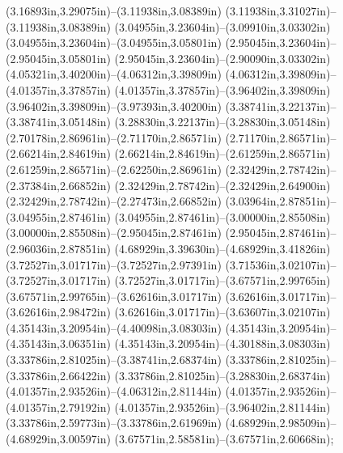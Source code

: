 (3.16893in,3.29075in)--(3.11938in,3.08389in) (3.11938in,3.31027in)--(3.11938in,3.08389in) (3.04955in,3.23604in)--(3.09910in,3.03302in) (3.04955in,3.23604in)--(3.04955in,3.05801in) (2.95045in,3.23604in)--(2.95045in,3.05801in) (2.95045in,3.23604in)--(2.90090in,3.03302in) (4.05321in,3.40200in)--(4.06312in,3.39809in) (4.06312in,3.39809in)--(4.01357in,3.37857in) (4.01357in,3.37857in)--(3.96402in,3.39809in) (3.96402in,3.39809in)--(3.97393in,3.40200in) (3.38741in,3.22137in)--(3.38741in,3.05148in) (3.28830in,3.22137in)--(3.28830in,3.05148in) (2.70178in,2.86961in)--(2.71170in,2.86571in) (2.71170in,2.86571in)--(2.66214in,2.84619in) (2.66214in,2.84619in)--(2.61259in,2.86571in) (2.61259in,2.86571in)--(2.62250in,2.86961in) (2.32429in,2.78742in)--(2.37384in,2.66852in) (2.32429in,2.78742in)--(2.32429in,2.64900in) (2.32429in,2.78742in)--(2.27473in,2.66852in) (3.03964in,2.87851in)--(3.04955in,2.87461in) (3.04955in,2.87461in)--(3.00000in,2.85508in) (3.00000in,2.85508in)--(2.95045in,2.87461in) (2.95045in,2.87461in)--(2.96036in,2.87851in) (4.68929in,3.39630in)--(4.68929in,3.41826in) (3.72527in,3.01717in)--(3.72527in,2.97391in) (3.71536in,3.02107in)--(3.72527in,3.01717in) (3.72527in,3.01717in)--(3.67571in,2.99765in) (3.67571in,2.99765in)--(3.62616in,3.01717in) (3.62616in,3.01717in)--(3.62616in,2.98472in) (3.62616in,3.01717in)--(3.63607in,3.02107in) (4.35143in,3.20954in)--(4.40098in,3.08303in) (4.35143in,3.20954in)--(4.35143in,3.06351in) (4.35143in,3.20954in)--(4.30188in,3.08303in) (3.33786in,2.81025in)--(3.38741in,2.68374in) (3.33786in,2.81025in)--(3.33786in,2.66422in) (3.33786in,2.81025in)--(3.28830in,2.68374in) (4.01357in,2.93526in)--(4.06312in,2.81144in) (4.01357in,2.93526in)--(4.01357in,2.79192in) (4.01357in,2.93526in)--(3.96402in,2.81144in) (3.33786in,2.59773in)--(3.33786in,2.61969in) (4.68929in,2.98509in)--(4.68929in,3.00597in) (3.67571in,2.58581in)--(3.67571in,2.60668in);
